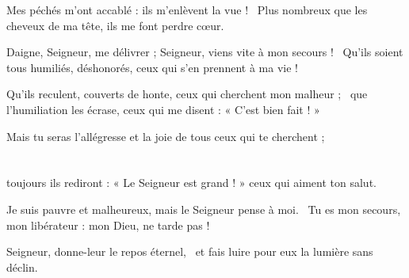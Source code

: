 \item Mes péchés m'ont accablé : ils m'enlèvent la vue !~\psstar{} Plus nombreux que les cheveux de ma tête, ils me font perdre cœur.

\item Daigne, Seigneur, me délivrer ; Seigneur, viens vite à mon secours !~\psstar{} Qu'ils soient tous humiliés, déshonorés, ceux qui s'en prennent à ma vie !

\item Qu'ils reculent, couverts de honte, ceux qui cherchent mon malheur ;~\psstar{} que l'humiliation les écrase, ceux qui me disent : « C'est bien fait ! »

\item Mais tu seras l'allégresse et la joie de tous ceux qui te cherchent ;~\psstar{} \\~\\~\\toujours ils rediront : « Le Seigneur est grand ! » ceux qui aiment ton salut.

\item Je suis pauvre et malheureux, mais le Seigneur pense à moi.~\psstar{} Tu es mon secours, mon libérateur : mon Dieu, ne tarde pas !

\item Seigneur, donne-leur le repos éternel,~\psstar{} et fais luire pour eux la lumière sans déclin.